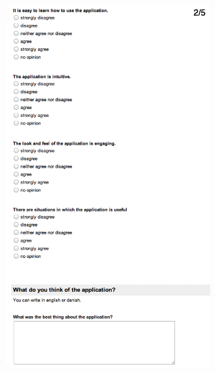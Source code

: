 \begin{figure}[htb]
  \centering
    \includegraphics[width=0.8\textwidth]{images/evalform2b}
\end{figure}

